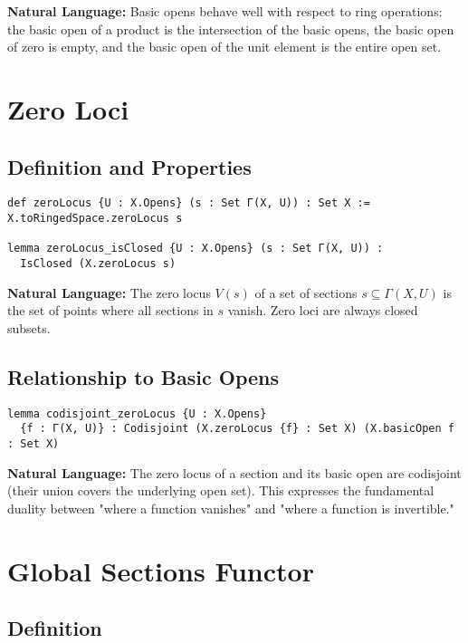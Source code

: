\documentclass{article}
\theoremstyle{definition}
\begin{document}
\textbf{Natural Language:} Basic opens behave well with respect to ring operations: the basic open of a product is the intersection of the basic opens, the basic open of zero is empty, and the basic open of the unit element is the entire open set.

\section{Zero Loci}

\subsection{Definition and Properties}

\begin{lstlisting}
def zeroLocus {U : X.Opens} (s : Set Γ(X, U)) : Set X := X.toRingedSpace.zeroLocus s

lemma zeroLocus_isClosed {U : X.Opens} (s : Set Γ(X, U)) :
  IsClosed (X.zeroLocus s)
\end{lstlisting}

\textbf{Natural Language:} The zero locus $V(s)$ of a set of sections $s \subseteq \Gamma(X, U)$ is the set of points where all sections in $s$ vanish. Zero loci are always closed subsets.

\subsection{Relationship to Basic Opens}

\begin{lstlisting}
lemma codisjoint_zeroLocus {U : X.Opens}
  {f : Γ(X, U)} : Codisjoint (X.zeroLocus {f} : Set X) (X.basicOpen f : Set X)
\end{lstlisting}

\textbf{Natural Language:} The zero locus of a section and its basic open are codisjoint (their union covers the underlying open set). This expresses the fundamental duality between "where a function vanishes" and "where a function is invertible."

\section{Global Sections Functor}

\subsection{Definition}
\end{document}
